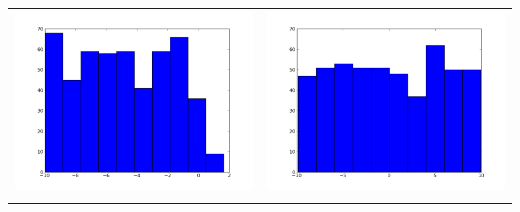 \documentclass[12pt,a4paper,titlepage]{article}
\begin{document}
\newpage
\begin{table}[ht]
\centering
\begin{tabular}{cc}
\includegraphics[scale=0.2]{p1th1_4}&\includegraphics[scale=0.2]{p1th2_4.png}\\
\newline

\end{tabular}
\end{table}
\end{document}
